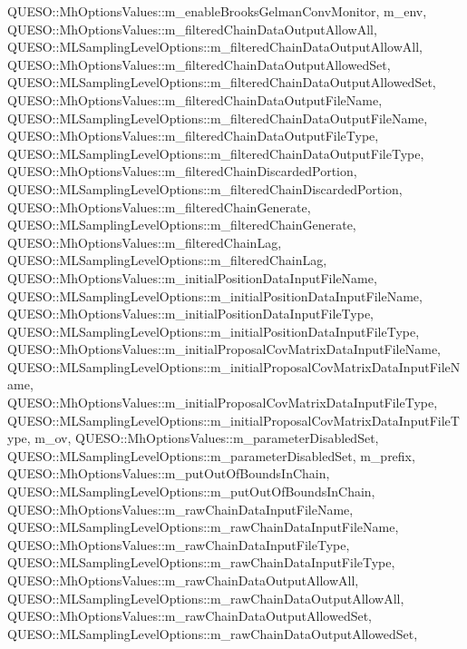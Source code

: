 Q\-U\-E\-S\-O\-::\-Mh\-Options\-Values\-::m\-\_\-enable\-Brooks\-Gelman\-Conv\-Monitor, m\-\_\-env, Q\-U\-E\-S\-O\-::\-Mh\-Options\-Values\-::m\-\_\-filtered\-Chain\-Data\-Output\-Allow\-All, Q\-U\-E\-S\-O\-::\-M\-L\-Sampling\-Level\-Options\-::m\-\_\-filtered\-Chain\-Data\-Output\-Allow\-All, Q\-U\-E\-S\-O\-::\-Mh\-Options\-Values\-::m\-\_\-filtered\-Chain\-Data\-Output\-Allowed\-Set, Q\-U\-E\-S\-O\-::\-M\-L\-Sampling\-Level\-Options\-::m\-\_\-filtered\-Chain\-Data\-Output\-Allowed\-Set, Q\-U\-E\-S\-O\-::\-Mh\-Options\-Values\-::m\-\_\-filtered\-Chain\-Data\-Output\-File\-Name, Q\-U\-E\-S\-O\-::\-M\-L\-Sampling\-Level\-Options\-::m\-\_\-filtered\-Chain\-Data\-Output\-File\-Name, Q\-U\-E\-S\-O\-::\-Mh\-Options\-Values\-::m\-\_\-filtered\-Chain\-Data\-Output\-File\-Type, Q\-U\-E\-S\-O\-::\-M\-L\-Sampling\-Level\-Options\-::m\-\_\-filtered\-Chain\-Data\-Output\-File\-Type, Q\-U\-E\-S\-O\-::\-Mh\-Options\-Values\-::m\-\_\-filtered\-Chain\-Discarded\-Portion, Q\-U\-E\-S\-O\-::\-M\-L\-Sampling\-Level\-Options\-::m\-\_\-filtered\-Chain\-Discarded\-Portion, Q\-U\-E\-S\-O\-::\-Mh\-Options\-Values\-::m\-\_\-filtered\-Chain\-Generate, Q\-U\-E\-S\-O\-::\-M\-L\-Sampling\-Level\-Options\-::m\-\_\-filtered\-Chain\-Generate, Q\-U\-E\-S\-O\-::\-Mh\-Options\-Values\-::m\-\_\-filtered\-Chain\-Lag, Q\-U\-E\-S\-O\-::\-M\-L\-Sampling\-Level\-Options\-::m\-\_\-filtered\-Chain\-Lag, Q\-U\-E\-S\-O\-::\-Mh\-Options\-Values\-::m\-\_\-initial\-Position\-Data\-Input\-File\-Name, Q\-U\-E\-S\-O\-::\-M\-L\-Sampling\-Level\-Options\-::m\-\_\-initial\-Position\-Data\-Input\-File\-Name, Q\-U\-E\-S\-O\-::\-Mh\-Options\-Values\-::m\-\_\-initial\-Position\-Data\-Input\-File\-Type, Q\-U\-E\-S\-O\-::\-M\-L\-Sampling\-Level\-Options\-::m\-\_\-initial\-Position\-Data\-Input\-File\-Type, Q\-U\-E\-S\-O\-::\-Mh\-Options\-Values\-::m\-\_\-initial\-Proposal\-Cov\-Matrix\-Data\-Input\-File\-Name, Q\-U\-E\-S\-O\-::\-M\-L\-Sampling\-Level\-Options\-::m\-\_\-initial\-Proposal\-Cov\-Matrix\-Data\-Input\-File\-Name, Q\-U\-E\-S\-O\-::\-Mh\-Options\-Values\-::m\-\_\-initial\-Proposal\-Cov\-Matrix\-Data\-Input\-File\-Type, Q\-U\-E\-S\-O\-::\-M\-L\-Sampling\-Level\-Options\-::m\-\_\-initial\-Proposal\-Cov\-Matrix\-Data\-Input\-File\-Type, m\-\_\-ov, Q\-U\-E\-S\-O\-::\-Mh\-Options\-Values\-::m\-\_\-parameter\-Disabled\-Set, Q\-U\-E\-S\-O\-::\-M\-L\-Sampling\-Level\-Options\-::m\-\_\-parameter\-Disabled\-Set, m\-\_\-prefix, Q\-U\-E\-S\-O\-::\-Mh\-Options\-Values\-::m\-\_\-put\-Out\-Of\-Bounds\-In\-Chain, Q\-U\-E\-S\-O\-::\-M\-L\-Sampling\-Level\-Options\-::m\-\_\-put\-Out\-Of\-Bounds\-In\-Chain, Q\-U\-E\-S\-O\-::\-Mh\-Options\-Values\-::m\-\_\-raw\-Chain\-Data\-Input\-File\-Name, Q\-U\-E\-S\-O\-::\-M\-L\-Sampling\-Level\-Options\-::m\-\_\-raw\-Chain\-Data\-Input\-File\-Name, Q\-U\-E\-S\-O\-::\-Mh\-Options\-Values\-::m\-\_\-raw\-Chain\-Data\-Input\-File\-Type, Q\-U\-E\-S\-O\-::\-M\-L\-Sampling\-Level\-Options\-::m\-\_\-raw\-Chain\-Data\-Input\-File\-Type, Q\-U\-E\-S\-O\-::\-Mh\-Options\-Values\-::m\-\_\-raw\-Chain\-Data\-Output\-Allow\-All, Q\-U\-E\-S\-O\-::\-M\-L\-Sampling\-Level\-Options\-::m\-\_\-raw\-Chain\-Data\-Output\-Allow\-All, Q\-U\-E\-S\-O\-::\-Mh\-Options\-Values\-::m\-\_\-raw\-Chain\-Data\-Output\-Allowed\-Set, Q\-U\-E\-S\-O\-::\-M\-L\-Sampling\-Level\-Options\-::m\-\_\-raw\-Chain\-Data\-Output\-Allowed\-Set, 